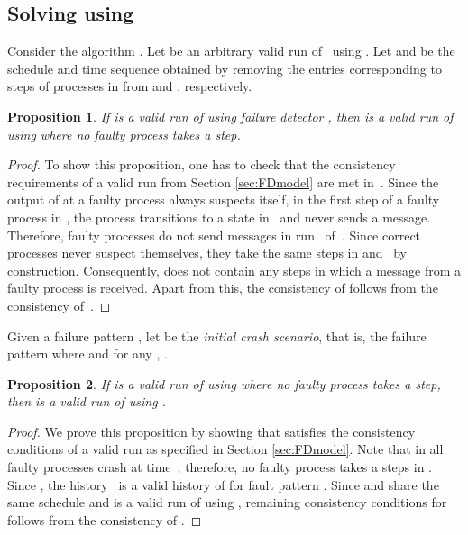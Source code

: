 \documentclass[11pt]{article}
\newtheorem{proposition}{Proposition}[section]
\newcommand{\emn}[1]{{\em #1\/}}
\begin{document}
\subsection{Solving  using }

Consider the algorithm .
Let  be an arbitrary valid run of~ using .
Let  and  be the schedule and time sequence obtained by
     removing the entries corresponding to steps of processes in
      from  and ,
     respectively.


\begin{proposition}\label{prop:RvalidMFDrun}
If  is a valid run of  using failure detector
     , then  is a valid run
     of  using  where no faulty process takes a step.
\end{proposition}
\begin{proof}
To show this proposition, one has to check that the consistency
     requirements of a valid run from Section \ref{sec:FDmodel} are
     met in~.
Since the output of  at a faulty process always suspects itself,
     in the first step of a faulty process in , the process
     transitions to a state in~ and never sends a message.
Therefore, faulty processes do not send messages  in
     run~ of~.
Since correct processes never suspect themselves, they take the same
     steps in  and~ by construction.
Consequently,  does not contain any steps in which a message from a
     faulty process is received.
Apart from this, the consistency of  follows from the consistency
     of~.
\end{proof}

Given a failure pattern , let  be the \emn{initial crash
     scenario}, that is, the failure pattern where   and for any , .

\begin{proposition}\label{prop:R0validMFDrun}
If  is a valid run of  using
      where no faulty process takes a step, then  is a valid run of  using
     .
\end{proposition}
\begin{proof}
We prove this proposition by showing that  satisfies the
     consistency conditions of a valid run as specified in Section
     \ref{sec:FDmodel}.
Note that in  all faulty processes crash at time~; therefore,
     no faulty process takes a steps in .
Since , the history~ is a valid history of
      for fault pattern .
Since  and  share the same schedule  and  is a valid
     run of  using , remaining consistency conditions for
      follows from the consistency of .
\end{proof}
\end{document}
